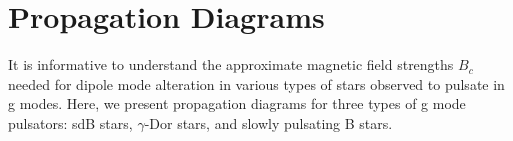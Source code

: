 \appendix
\section{Propagation Diagrams}

It is informative to understand the approximate magnetic field strengths $B_c$ needed for dipole mode alteration in various types of stars observed to pulsate in g modes. Here, we present propagation diagrams for three types of g mode pulsators: sdB stars, $\gamma$-Dor stars, and slowly pulsating B stars. 
